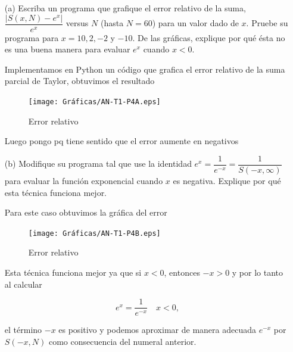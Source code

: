 \documentclass[12pt, a4paper]{article}%
\begin{document}
\begin{itemize}
    \item[(a)] Escriba un programa que grafique el error relativo de la suma, \( \dfrac{|S(x, N) - e^x|}{e^x} \) versus \( N \) (hasta \( N = 60 \)) para un valor dado de \( x \). Pruebe su programa para \( x = 10, 2, -2 \) y \( -10 \). De las gráficas, explique por qué ésta no es una buena manera para evaluar \( e^x \) cuando \( x < 0 \).

    \begin{solution}

    Implementamos en Python un código que grafica el error relativo de la suma parcial de Taylor, obtuvimos el resultado

    \begin{figure}[H]
        \centering
        \texttt{[image: Gráficas/AN-T1-P4A.eps]}
        \caption{Error relativo}
        \label{coyo4}
    \end{figure}

Luego pongo pq tiene sentido que el error aumente en negativos
    \end{solution}
    
    \item[(b)] Modifique su programa tal que use la identidad \( e^x = \dfrac{1}{e^{-x}} = \dfrac{1}{S(-x, \infty)} \) para evaluar la función exponencial cuando \( x \) es negativa. Explique por qué esta técnica funciona mejor.

\begin{solution}
    Para este caso obtuvimos la gráfica del error

    \begin{figure}[H]
        \centering
        \texttt{[image: Gráficas/AN-T1-P4B.eps]}
        \caption{Error relativo}
        \label{coyo4B}
    \end{figure}

    Esta técnica funciona mejor ya que si $x<0$, entonces $-x>0$ y por lo tanto al calcular 

    $$e^x=\dfrac{1}{e^{-x}}\quad x<0,$$

    el término $-x$ es positivo y podemos aproximar de manera adecuada $e^{-x}$ por $S(-x,N)$ como consecuencia del numeral anterior.
\end{solution}
    
\end{itemize}
\end{document}
